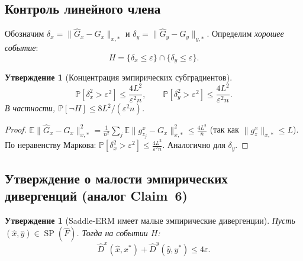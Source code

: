 \documentclass[12pt,a4paper]{article}
\theoremstyle{plain}
\newtheorem{claim}[theorem]{Утверждение}
\theoremstyle{definition}
\DeclareMathOperator{\SP}{SP}
\newcommand{\E}{\mathbb{E}}
\renewcommand{\Pr}{\mathbb{P}}
\newcommand{\hatF}{\hat{F}}
\newcommand{\hatD}{\hat{D}}
\newcommand{\hatG}{\hat{G}}
\begin{document}
\subsection{Контроль линейного члена}

Обозначим $\delta_x=\|\hatG_x-G_x\|_{x,*}$ и $\delta_y=\|\hatG_y-G_y\|_{y,*}$. Определим \emph{хорошее событие}:
\[
    H = \{\delta_x\le\varepsilon\}\cap\{\delta_y\le\varepsilon\}.
\]

\begin{claim}[Концентрация эмпирических субградиентов]
\label{claim:grad_conc}
\[
    \Pr[\delta_x^2>\varepsilon^2]\le\frac{4L^2}{\varepsilon^2 n},\qquad
    \Pr[\delta_y^2>\varepsilon^2]\le\frac{4L^2}{\varepsilon^2 n}.
\]
В частности, $\Pr[\neg H]\le 8L^2/(\varepsilon^2 n)$.
\end{claim}

\begin{proof}
$\E\|\hatG_x-G_x\|_{x,*}^2=\frac{1}{n^2}\sum_j\E\|g_{z_j}^x-G_x\|_{x,*}^2\le\frac{4L^2}{n}$ (так как $\|g_z^x\|_{x,*}\le L$). По неравенству Маркова: $\Pr[\delta_x^2>\varepsilon^2]\le\frac{4L^2}{\varepsilon^2 n}$. Аналогично для $\delta_y$.
\end{proof}

\subsection{Утверждение о малости эмпирических дивергенций (аналог Claim~6)}

\begin{claim}[Saddle-ERM имеет малые эмпирические дивергенции]
\label{claim:saddle_claim6}
Пусть $(\hat{x},\hat{y})\in\SP(\hatF)$. Тогда на событии $H$:
\[
    \hatD^x(\hat{x},x^*)+\hatD^y(\hat{y},y^*)\le 4\varepsilon.
\]
\end{claim}
\end{document}
